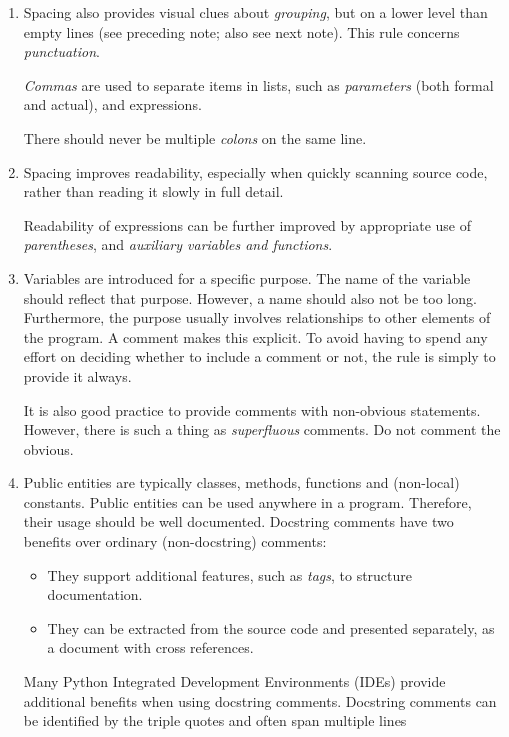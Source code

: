 \documentclass[a4paper,11pt]{article}
\begin{document}
\begin{enumerate}
\item Spacing also provides visual clues about \emph{grouping},
  but on a lower level than empty lines
  (see preceding note; also see next note).
  This rule concerns \emph{punctuation}.
  
  \emph{Commas\/} are used to separate items in lists,
  such as \emph{parameters\/} (both formal and actual),
  and expressions.
  
  There should never be multiple \emph{colons\/} on the same line.
  
\item Spacing improves readability,
  especially when quickly scanning source code,
  rather than reading it slowly in full detail.
  
  Readability of expressions can be further improved by appropriate
  use of \emph{parentheses}, and \emph{auxiliary variables and functions}.

\item Variables are introduced for a specific purpose.
  The name of the variable should reflect that purpose.
  However, a name should also not be too long.
  Furthermore, the purpose usually involves relationships to other
  elements of the program.
  A comment makes this explicit.
  To avoid having to spend any effort on deciding whether to include a comment or not,
  the rule is simply to provide it always.
  
  It is also good practice to provide comments with non-obvious statements.
  However, there is such a thing as \emph{superfluous\/} comments.
  Do not comment the obvious.

\item Public entities are typically classes, methods, functions 
  and (non-local) constants.
  Public entities can be used anywhere in a program.
  Therefore,
  their usage should be well documented.
  Docstring comments have two benefits over ordinary (non-docstring) comments:
  \begin{itemize}
  \item They support additional features, such as \emph{tags},
    to structure documentation.
  \item They can be extracted from the source code and presented separately,
    as a document with cross references.
  \end{itemize}
  Many Python Integrated Development Environments (IDEs)
  provide additional benefits when using docstring comments. 
  Docstring comments can be identified by the triple quotes and often span multiple lines 
  

\end{enumerate}
\end{document}

